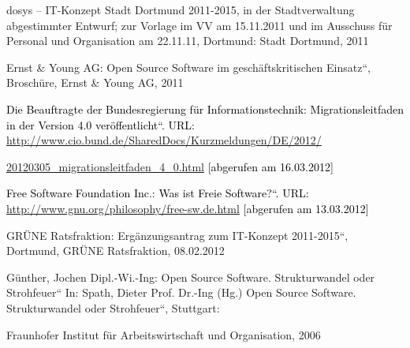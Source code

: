 \documentclass[a4paper]{article}
\newcommand\textstyleInternetlink[1]{\foreignlanguage{english}{\textcolor[rgb]{0.0,0.0,0.5019608}{#1}}}
\begin{document}
\bigskip

{
dosys -- IT-Konzept Stadt Dortmund 2011-2015, in der Stadtverwaltung
abgestimmter Entwurf; zur Vorlage im VV am 15.11.2011 und im Ausschuss
f\"ur Personal und Organisation am 22.11.11, Dortmund: Stadt Dortmund,
2011}


\bigskip

{
Ernst \& Young AG: {\quotedblbase}Open Source Software im
gesch\"aftskritischen Einsatz{\textquotedblleft}, Brosch\"ure, Ernst \&
Young AG, 2011}


\bigskip

{
\textstyleInternetlink{\textcolor{black}{Die Beauftragte der
Bundesregierung f\"ur Informationstechnik:
{\quotedblbase}Migrationsleitfaden in der Version 4.0
ver\"offentlicht{\textquotedblleft}. URL:
}}\href{http://www.cio.bund.de/SharedDocs/Kurzmeldungen/DE/2012/20120305_migrationsleitfaden_4_0.html}{\textstyleInternetlink{http://www.cio.bund.de/SharedDocs/Kurzmeldungen/DE/2012/}}}

{
\href{http://www.cio.bund.de/SharedDocs/Kurzmeldungen/DE/2012/20120305_migrationsleitfaden_4_0.html}{\textstyleInternetlink{20120305\_migrationsleitfaden\_4\_0.html}}\textstyleInternetlink{\textcolor{black}{
[abgerufen am }}\textstyleInternetlink{\textcolor{black}{16.03.2012]}}}


\bigskip

{
\textstyleInternetlink{\textcolor{black}{Free Software Foundation Inc.:
{\quotedblbase}Was ist Freie Software?{\textquotedblleft}. URL:
}}\url{http://www.gnu.org/philosophy/free-sw.de.html}\textstyleInternetlink{\textcolor{black}{
}}\textstyleInternetlink{\textcolor{black}{[abgerufen am 13.03.2012]}}}


\bigskip

{
GR\"UNE Ratsfraktion: {\quotedblbase}Erg\"anzungsantrag zum IT-Konzept
2011-2015{\textquotedblleft}, Dortmund, GR\"UNE Ratsfraktion,
08.02.2012}

{
G\"unther, Jochen Dipl.-Wi.-Ing: {\quotedblbase}Open Source Software.
Strukturwandel oder Strohfeuer{\textquotedblleft} In: Spath, Dieter
Prof. Dr.-Ing (Hg.) {\quotedblbase}Open Source Software. Strukturwandel
oder Strohfeuer{\textquotedblleft}, Stuttgart: }

{
Fraunhofer Institut f\"ur Arbeitswirtschaft und Organisation, 2006}


\bigskip
\end{document}
